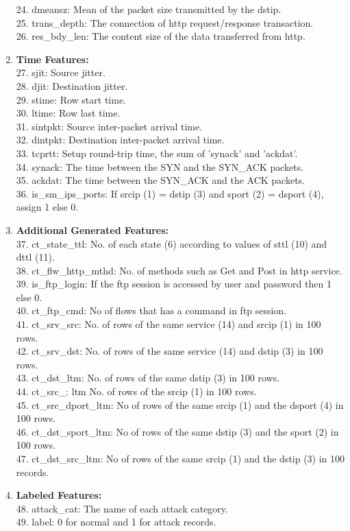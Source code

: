 \begin{enumerate}
    24. dmeansz: Mean of the packet size transmitted by the dstip. \\
    25. trans\_depth: The connection of http request/response transaction. \\
    26. res\_bdy\_len: The content size of the data transferred from http.
\item \textbf{Time Features:} \\
    27. sjit: Source jitter. \\
    28. djit: Destination jitter. \\
    29. stime: Row start time. \\
    30. ltime: Row last time. \\
    31. sintpkt: Source inter-packet arrival time. \\
    32. dintpkt: Destination inter-packet arrival time. \\
    33. tcprtt: Setup round-trip time, the sum of ’synack’ and ’ackdat’. \\
    34. synack: The time between the SYN and the SYN\_ACK packets. \\
    35. ackdat: The time between the SYN\_ACK and the ACK packets. \\
    36. is\_sm\_ips\_ports: If srcip (1) = dstip (3) and sport (2) = dsport (4), assign 1 else 0.
\item \textbf{Additional Generated Features:} \\
    37. ct\_state\_ttl: No. of each state (6) according to values of sttl (10) and dttl (11). \\
    38. ct\_flw\_http\_mthd: No. of methods such as Get and Post in http service. \\
    39. is\_ftp\_login: If the ftp session is accessed by user and password then 1 else 0. \\
    40. ct\_ftp\_cmd: No of flows that has a command in ftp session. \\
    41. ct\_srv\_src: No. of rows of the same service (14) and srcip (1) in 100 rows. \\
    42. ct\_srv\_dst: No. of rows of the same service (14) and dstip (3) in 100 rows. \\
    43. ct\_dst\_ltm: No. of rows of the same dstip (3) in 100 rows. \\
    44. ct\_src\_: ltm No. of rows of the srcip (1) in 100 rows. \\
    45. ct\_src\_dport\_ltm: No of rows of the same srcip (1) and the dsport (4) in 100 rows. \\
    46. ct\_dst\_sport\_ltm: No of rows of the same dstip (3) and the sport (2) in 100 rows. \\
    47. ct\_dst\_src\_ltm: No of rows of the same srcip (1) and the dstip (3) in 100 records.
\item \textbf{Labeled Features:} \\
    48. attack\_cat: The name of each attack category. \\
    49. label: 0 for normal and 1 for attack records.
\end{enumerate}

